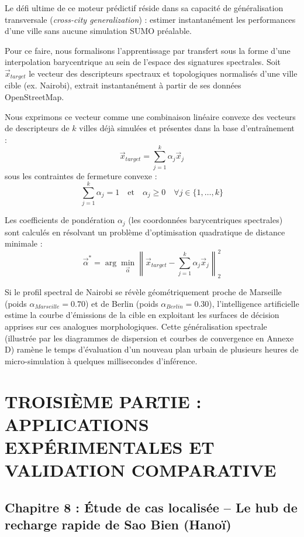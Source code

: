 \documentclass[10pt, a4paper]{article}
\begin{document}
Le défi ultime de ce moteur prédictif réside dans sa capacité de
généralisation transversale (\emph{cross-city generalization}) : estimer
instantanément les performances d'une ville sans aucune simulation SUMO
préalable.

Pour ce faire, nous formalisons l'apprentissage par transfert sous la
forme d'une interpolation barycentrique au sein de l'espace des
signatures spectrales. Soit \(\vec{x}_{target}\) le vecteur des
descripteurs spectraux et topologiques normalisés d'une ville cible (ex.
Nairobi), extrait instantanément à partir de ses données OpenStreetMap.

Nous exprimons ce vecteur comme une combinaison linéaire convexe des
vecteurs de descripteurs de \(k\) villes déjà simulées et présentes dans
la base d'entraînement :
\[\vec{x}_{target} = \sum_{j=1}^k \alpha_j \vec{x}_j\] sous les
contraintes de fermeture convexe :
\[\sum_{j=1}^k \alpha_j = 1 \quad \text{et} \quad \alpha_j \ge 0 \quad \forall j \in \{1, \dots, k\}\]

Les coefficients de pondération \(\alpha_j\) (les coordonnées
barycentriques spectrales) sont calculés en résolvant un problème
d'optimisation quadratique de distance minimale :
\[\vec{\alpha}^* = \arg\min_{\vec{\alpha}} \left\| \vec{x}_{target} - \sum_{j=1}^k \alpha_j \vec{x}_j \right\|_2^2\]

Si le profil spectral de Nairobi se révèle géométriquement proche de
Marseille (poids \(\alpha_{Marseille} = 0.70\)) et de Berlin (poids
\(\alpha_{Berlin} = 0.30\)), l'intelligence artificielle estime la
courbe d'émissions de la cible en exploitant les surfaces de décision
apprises sur ces analogues morphologiques. Cette généralisation
spectrale (illustrée par les diagrammes de dispersion et courbes de
convergence en Annexe D) ramène le temps d'évaluation d'un nouveau plan
urbain de plusieurs heures de micro-simulation à quelques millisecondes
d'inférence.

\newpage

\section{TROISIÈME PARTIE : APPLICATIONS EXPÉRIMENTALES ET VALIDATION
COMPARATIVE}\label{troisiuxe8me-partie-applications-expuxe9rimentales-et-validation-comparative}

\subsection{Chapitre 8 : Étude de cas localisée -- Le hub de recharge
rapide de Sao Bien
(Hanoï)}\label{chapitre-8-uxe9tude-de-cas-localisuxe9e-le-hub-de-recharge-rapide-de-sao-bien-hanouxef}
\end{document}
